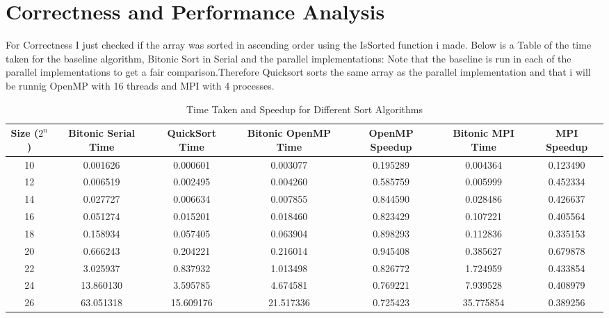 \section{Correctness and Performance Analysis}
For Correctness I just checked if the array was sorted in ascending order using the IsSorted function i made.
Below is a Table of the time taken for the baseline algorithm, Bitonic Sort in Serial and the parallel implementations: Note that the baseline is run in each of the parallel implementations to get a fair comparison.Therefore Quicksort sorts the same array as the parallel implementation and that i will be runnig OpenMP with 16 threads and MPI with 4 processes.
\begin{table}[h]
    \centering
    \small
    \begin{tabular}{|c|c|c|c|c|c|c|}
        \hline
        \textbf{Size ($2^n$)} & \textbf{Bitonic Serial Time} & \textbf{QuickSort Time} & \textbf{Bitonic OpenMP Time} & \textbf{OpenMP Speedup} & \textbf{Bitonic MPI Time} & \textbf{MPI Speedup} \\
        \hline
        10 & 0.001626 & 0.000601 & 0.003077 & 0.195289 & 0.004364 & 0.123490 \\
        12 & 0.006519 & 0.002495 & 0.004260 & 0.585759 & 0.005999 & 0.452334 \\
        14 & 0.027727 & 0.006634 & 0.007855 & 0.844590 & 0.028486 & 0.426637 \\
        16 & 0.051274 & 0.015201 & 0.018460 & 0.823429 & 0.107221 & 0.405564 \\
        18 & 0.158934 & 0.057405 & 0.063904 & 0.898293 & 0.112836 & 0.335153 \\
        20 & 0.666243 & 0.204221 & 0.216014 & 0.945408 & 0.385627 & 0.679878 \\
        22 & 3.025937 & 0.837932 & 1.013498 & 0.826772 & 1.724959 & 0.433854 \\
        24 & 13.860130 & 3.595785 & 4.674581 & 0.769221 & 7.939528 & 0.408979 \\
        26 & 63.051318 & 15.609176 & 21.517336 & 0.725423 & 35.775854 & 0.389256 \\
        \hline
    \end{tabular}
    \caption{Time Taken and Speedup for Different Sort Algorithms}
    \label{table:sort_results}
\end{table}


